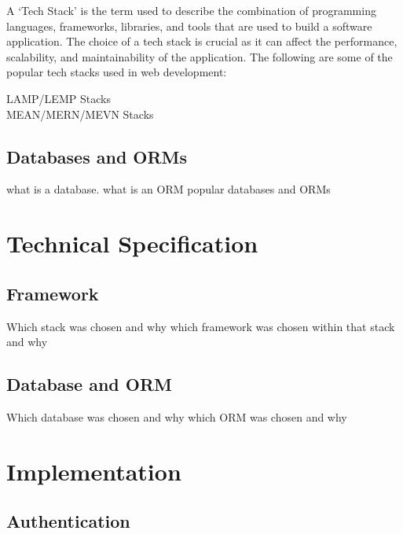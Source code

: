 \documentclass[12pt, a4paper,twoside]{report}
\theoremstyle{plain} %
\theoremstyle{definition} %
\numberwithin{equation}{chapter}
\begin{document}
A `Tech Stack' is the term used to describe the combination of programming
languages, frameworks, libraries, and tools that are used to build a software
application. The choice of a tech stack is crucial as it can affect the
performance, scalability, and maintainability of the application. The following
are some of the popular tech stacks used in web development:

\begin{description}
    \item[LAMP/LEMP Stacks] {}
    \item[MEAN/MERN/MEVN Stacks] {}
\end{description}

\section{Databases and ORMs}\label{sec:databasesorms}

what is a database.
what is an ORM
popular databases and ORMs


\chapter{Technical Specification}\label{ch:techspec}

\section{Framework}\label{sec:framework}

Which stack was chosen and why
which framework was chosen within that stack and why

\section{Database and ORM}\label{sec:databaseorm}

Which database was chosen and why
which ORM was chosen and why


\chapter{Implementation}\label{ch:implementation}

\section{Authentication}\label{sec:authentication}
\end{document}
